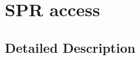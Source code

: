 \hypertarget{group__or1k__spr}{\section{S\-P\-R access}
\label{group__or1k__spr}
}


\subsection{Detailed Description}

